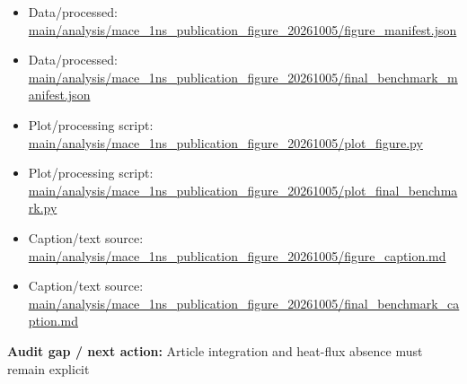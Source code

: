 \documentclass[10pt]{article}
\newcommand{\statusline}[1]{\colorbox{gray!12}{\parbox{0.96\linewidth}{#1}}}
\begin{document}
\begin{itemize}[leftmargin=1.4em,noitemsep]
\item Data/processed: \begingroup\scriptsize\url{main/analysis/mace_1ns_publication_figure_20261005/figure_manifest.json}\endgroup
\item Data/processed: \begingroup\scriptsize\url{main/analysis/mace_1ns_publication_figure_20261005/final_benchmark_manifest.json}\endgroup
\item Plot/processing script: \begingroup\scriptsize\url{main/analysis/mace_1ns_publication_figure_20261005/plot_figure.py}\endgroup
\item Plot/processing script: \begingroup\scriptsize\url{main/analysis/mace_1ns_publication_figure_20261005/plot_final_benchmark.py}\endgroup
\item Caption/text source: \begingroup\scriptsize\url{main/analysis/mace_1ns_publication_figure_20261005/figure_caption.md}\endgroup
\item Caption/text source: \begingroup\scriptsize\url{main/analysis/mace_1ns_publication_figure_20261005/final_benchmark_caption.md}\endgroup
\end{itemize}
\statusline{\textbf{Audit gap / next action:} Article integration and heat-flux absence must remain explicit}
\vfill
\clearpage
\end{document}
